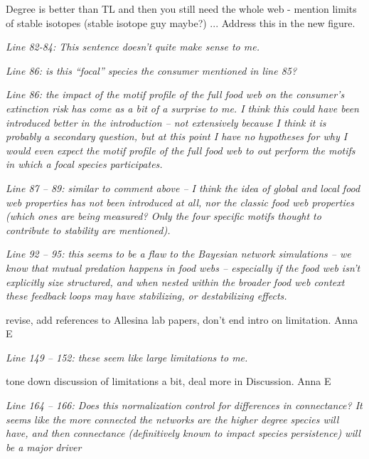 \documentclass[12pt]{article}
\newcommand{\us}{\rm \setlength{\leftskip}{0.3cm} \setlength{\rightskip}{0.3cm}}
\newcommand{\them}{\it \setlength{\leftskip}{0cm} \setlength{\rightskip}{0cm}}
\begin{document}
\us Degree is better than TL and then you still need the whole web - mention limits of stable isotopes (stable isotope guy maybe?) ... Address this in the new figure. 

\them
Line 82-84: This sentence doesn’t quite make sense to me.

\us

\them
Line 86: is this “focal” species the consumer mentioned in line 85?

\us

\them
Line 86: the impact of the motif profile of the full food web on the consumer’s extinction risk has come as a bit of a surprise to me. I think this could have been introduced better in the introduction – not extensively because I think it is probably a secondary question, but at this point I have no hypotheses for why I would even expect the motif profile of the full food web to out perform the motifs in which a focal species participates.

\us

\them
Line 87 – 89: similar to comment above – I think the idea of global and local food web properties has not been introduced at all, nor the classic food web properties (which ones are being measured? Only the four specific motifs thought to contribute to stability are mentioned).

\us

\them
Line 92 – 95: this seems to be a flaw to the Bayesian network simulations – we know that mutual predation happens in food webs – especially if the food web isn’t explicitly size structured, and when nested within the broader food web context these feedback loops may have stabilizing, or destabilizing effects.

\us revise, add references to Allesina lab papers, don't end intro on limitation. Anna E

\them
Line 149 – 152: these seem like large limitations to me.

\us tone down discussion of limitations a bit, deal more in Discussion. Anna E

\them
Line 164 – 166: Does this normalization control for differences in connectance? It seems like the more connected the networks are the higher degree species will have, and then connectance (definitively known to impact species persistence) will be a major driver
\end{document}
